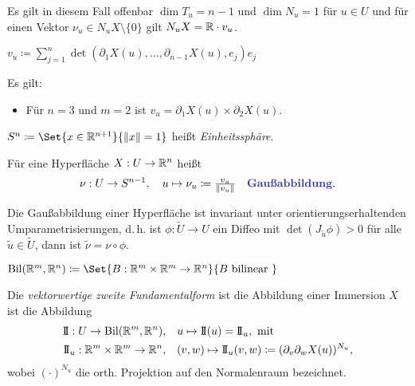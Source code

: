 \documentclass{cheat-sheet}
\newcommand{\Bil}{\mathrm{Bil}} %
\newcommand{\FFII}{\mathrm{I\!I}} %
\begin{document}
\begin{bem}
  Es gilt in diesem Fall offenbar $\dim T_u = n - 1$ und $\dim N_u = 1$ für $u \in U$ und für einen Vektor $\nu_u \in N_u X \setminus \{ 0 \}$ gilt $N_u X = \mathbb{R} \cdot v_u$.
\end{bem}

\begin{defn}
  $v_u \coloneqq \sum_{j=1}^{n} \det(\partial_1 X(u), ..., \partial_{n-1} X(u), e_j) e_j$
\end{defn}

\begin{bem}
  Es gilt:
  \begin{itemize}
    \item Für $n = 3$ und $m = 2$ ist $v_u = \partial_1 X(u) \times \partial_2 X(u)$.
  \end{itemize}
\end{bem}

\begin{nota}
  $S^{n} \coloneqq \Set{x \in \R^{n+1}}{\norm{x} = 1}$ heißt \emph{Einheitssphäre}.
\end{nota}

\begin{defn}
  Für eine Hyperfläche $X : U \to \mathbb{R}^n$ heißt
  \[
    \nu : U \to S^{n-1}, \quad u \mapsto \nu_u \coloneqq \tfrac{v_u}{\norm{v_u}}
    \quad \text{\emph{Gaußabbildung}.}
  \]
\end{defn}

\begin{satz}
  Die Gaußabbildung einer Hyperfläche ist invariant unter orientierungserhaltenden Umparametrisierungen, d.\,h. ist $\phi : \tilde{U} \to U$ ein Diffeo mit $\det(J_{\tilde{u}} \phi) > 0$ für alle $\tilde{u} \in \tilde{U}$, dann ist $\tilde{\nu} = \nu \circ \phi$.
\end{satz}


\begin{nota}
  $\Bil(\R^m, \R^n) \coloneqq \Set{ B : \R^m \times \R^m \to \R^n }{ B \text{ bilinear } }$
\end{nota}

\begin{defn}
  Die \emph{vektorwertige zweite Fundamentalform} ist die Abbildung einer Immersion $X$ ist die Abbildung
  \begin{align*}
    \FFII : U \to \Bil(\R^m, \R^n), \quad & u \mapsto \FFII(u) = \FFII_u, \text { mit } \\
    \FFII_u : \R^m \times \R^m \to \R^n, \quad & (v, w) \mapsto \FFII_u(v, w) \coloneqq (\partial_v \partial_w X(u))^{N_u},
  \end{align*}
  wobei $(\cdot)^{N_u}$ die orth. Projektion auf den Normalenraum bezeichnet.
\end{defn}
\end{document}
